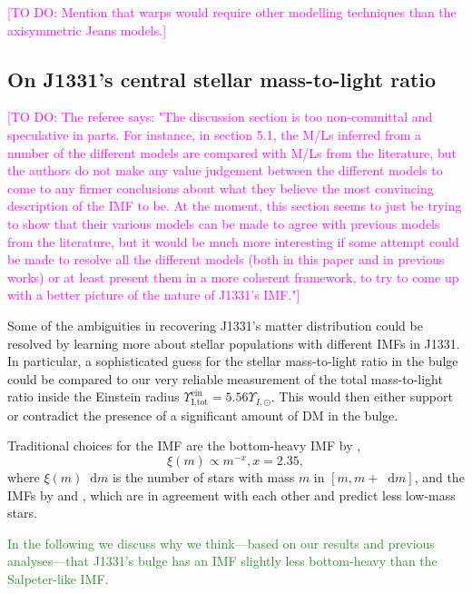 \documentclass[useAMS,usenatbib]{mnras}
\newcommand*\diff{\mathop{}\!\mathrm{d}}
\newcommand{\Wilma}[1]{\textcolor{Magenta}{#1}}
\newcommand{\NEW}[1]{\textcolor{ForestGreen}{#1}}
\begin{document}
\Wilma{[TO DO: Mention that warps would require other modelling techniques than the axisymmetric Jeans models.]}

\subsection{On J1331's central stellar mass-to-light ratio} \label{sec:MLdiscussion}

\Wilma{[TO DO: The referee says: "The discussion section is too non-committal and speculative in parts. For instance,
in section 5.1, the M/Ls inferred from a number of the different models are compared
with M/Ls from the literature, but the authors do not make any value judgement
between the different models to come to any firmer conclusions about what they
believe the most convincing description of the IMF to be. At the moment, this
section seems to just be trying to show that their various models can be made to
agree with previous models from the literature, but it would be much more
interesting if some attempt could be made to resolve all the different models (both
in this paper and in previous works) or at least present them in a more coherent
framework, to try to come up with a better picture of the nature of J1331's IMF."]}

Some of the ambiguities in recovering J1331's matter distribution could be resolved by learning more about stellar populations with different IMFs in J1331. In particular, a sophisticated guess for the stellar mass-to-light ratio in the bulge could be compared to our very reliable measurement of the total mass-to-light ratio inside the Einstein radius $\Upsilon_\text{I,tot}^\text{ein} = 5.56 \Upsilon_{I,\odot}$. This would then either support or contradict the presence of a significant amount of DM in the bulge.

Traditional choices for the IMF are the bottom-heavy IMF by \citet{Salpeter1955},
$$\xi(m) \propto m^{-x}, x=2.35,$$
where $\xi(m) \diff m$ is the number of stars with mass $m$ in $[m,m+\diff m]$, and the IMFs by \citet{2002Sci...295...82K} and \citet{Chabrier2003}, which are in agreement with each other and predict less low-mass stars.

\NEW{In the following we discuss why we think---based on our results and previous analyses---that J1331's bulge has an IMF slightly less bottom-heavy than the Salpeter-like IMF.}
\end{document}
